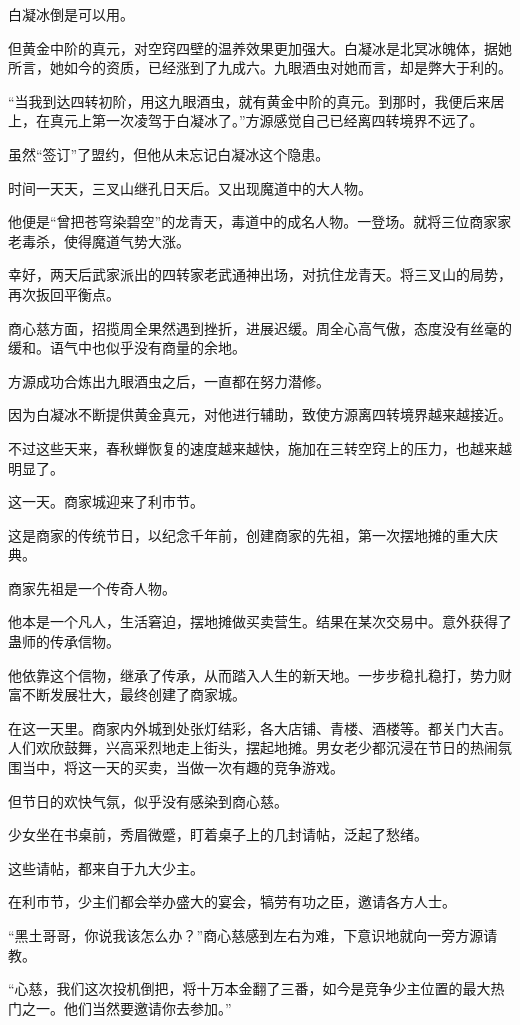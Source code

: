 \begin{this_body}
白凝冰倒是可以用。

但黄金中阶的真元，对空窍四壁的温养效果更加强大。白凝冰是北冥冰魄体，据她所言，她如今的资质，已经涨到了九成六。九眼酒虫对她而言，却是弊大于利的。

“当我到达四转初阶，用这九眼酒虫，就有黄金中阶的真元。到那时，我便后来居上，在真元上第一次凌驾于白凝冰了。”方源感觉自己已经离四转境界不远了。

虽然“签订”了盟约，但他从未忘记白凝冰这个隐患。

时间一天天，三叉山继孔日天后。又出现魔道中的大人物。

他便是“曾把苍穹染碧空”的龙青天，毒道中的成名人物。一登场。就将三位商家家老毒杀，使得魔道气势大涨。

幸好，两天后武家派出的四转家老武通神出场，对抗住龙青天。将三叉山的局势，再次扳回平衡点。

商心慈方面，招揽周全果然遇到挫折，进展迟缓。周全心高气傲，态度没有丝毫的缓和。语气中也似乎没有商量的余地。

方源成功合炼出九眼酒虫之后，一直都在努力潜修。

因为白凝冰不断提供黄金真元，对他进行辅助，致使方源离四转境界越来越接近。

不过这些天来，春秋蝉恢复的速度越来越快，施加在三转空窍上的压力，也越来越明显了。

这一天。商家城迎来了利市节。

这是商家的传统节日，以纪念千年前，创建商家的先祖，第一次摆地摊的重大庆典。

商家先祖是一个传奇人物。

他本是一个凡人，生活窘迫，摆地摊做买卖营生。结果在某次交易中。意外获得了蛊师的传承信物。

他依靠这个信物，继承了传承，从而踏入人生的新天地。一步步稳扎稳打，势力财富不断发展壮大，最终创建了商家城。

在这一天里。商家内外城到处张灯结彩，各大店铺、青楼、酒楼等。都关门大吉。人们欢欣鼓舞，兴高采烈地走上街头，摆起地摊。男女老少都沉浸在节日的热闹氛围当中，将这一天的买卖，当做一次有趣的竞争游戏。

但节日的欢快气氛，似乎没有感染到商心慈。

少女坐在书桌前，秀眉微蹙，盯着桌子上的几封请帖，泛起了愁绪。

这些请帖，都来自于九大少主。

在利市节，少主们都会举办盛大的宴会，犒劳有功之臣，邀请各方人士。

“黑土哥哥，你说我该怎么办？”商心慈感到左右为难，下意识地就向一旁方源请教。

“心慈，我们这次投机倒把，将十万本金翻了三番，如今是竞争少主位置的最大热门之一。他们当然要邀请你去参加。”


\end{this_body}
